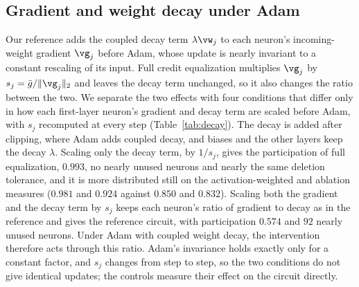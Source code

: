 \documentclass{article} %
\begin{document}
\subsection{Gradient and weight decay under Adam}
\label{app:decay}
Our reference adds the coupled decay term $\lambda \vw_j$ to each neuron's incoming-weight gradient $\vg_j$ before Adam, whose update is nearly invariant to a constant rescaling of its input. Full credit equalization multiplies $\vg_j$ by $s_j = \bar{g}/\|\vg_j\|_2$ and leaves the decay term unchanged, so it also changes the ratio between the two. We separate the two effects with four conditions that differ only in how each first-layer neuron's gradient and decay term are scaled before Adam, with $s_j$ recomputed at every step (Table~\ref{tab:decay}). The decay is added after clipping, where Adam adds coupled decay, and biases and the other layers keep the decay $\lambda$. Scaling only the decay term, by $1/s_j$, gives the participation of full equalization, $0.993$, no nearly unused neurons and nearly the same deletion tolerance, and it is more distributed still on the activation-weighted and ablation measures ($0.981$ and $0.924$ against $0.850$ and $0.832$). Scaling both the gradient and the decay term by $s_j$ keeps each neuron's ratio of gradient to decay as in the reference and gives the reference circuit, with participation $0.574$ and $92$ nearly unused neurons. Under Adam with coupled weight decay, the intervention therefore acts through this ratio. Adam's invariance holds exactly only for a constant factor, and $s_j$ changes from step to step, so the two conditions do not give identical updates; the controls measure their effect on the circuit directly.
\end{document}
